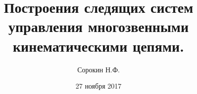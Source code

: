 \documentclass[12pt,a4paper,titlepage]{article}
\begin{document}
\date{27 ноября 2017}

\title{Построения следящих систем управления многозвенными кинематическими цепями.}
\author{Сорокин Н.Ф.}

\maketitle

























%


\end{document}
